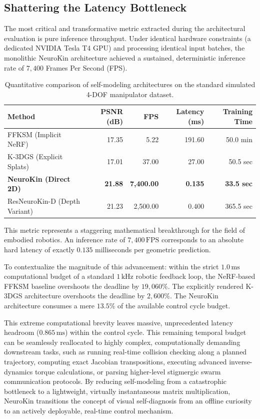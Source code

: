 \documentclass[12pt,a4paper,oneside]{report}
\begin{document}
\subsection{Shattering the Latency Bottleneck}

The most critical and transformative metric extracted during the architectural evaluation is pure inference throughput. Under identical hardware constraints (a dedicated NVIDIA Tesla T4 GPU) and processing identical input batches, the monolithic NeuroKin architecture achieved a sustained, deterministic inference rate of $7{,}400$ Frames Per Second (FPS).

\begin{table}[H]
\centering
\caption{Quantitative comparison of self-modeling architectures on the standard simulated 4-DOF manipulator dataset.}
\label{tab:final_baseline_metrics}
\begin{tabular}{lrrrr}
\toprule
\textbf{Method} & \textbf{PSNR (dB)} & \textbf{FPS} & \textbf{Latency (ms)} & \textbf{Training Time} \\
\midrule
FFKSM (Implicit NeRF) & 17.35 & 5.22 & 191.60 & 50.0 min \\
K-3DGS (Explicit Splats) & 17.01 & 37.00 & 27.00 & 50.5 sec \\
\textbf{NeuroKin (Direct 2D)} & \textbf{21.88} & \textbf{7,400.00} & \textbf{0.135} & \textbf{33.5 sec} \\
ResNeuroKin-D (Depth Variant) & 21.23 & 2,500.00 & 0.400 & 365.5 sec \\
\bottomrule
\end{tabular}
\end{table}

This metric represents a staggering mathematical breakthrough for the field of embodied robotics. An inference rate of $7{,}400\,\mathrm{FPS}$ corresponds to an absolute hard latency of exactly $0.135$ milliseconds per geometric prediction. 

To contextualize the magnitude of this advancement: within the strict $1.0\,\mathrm{ms}$ computational budget of a standard $1\,\mathrm{kHz}$ robotic feedback loop, the NeRF-based FFKSM baseline overshoots the deadline by $19,060\%$. The explicitly rendered K-3DGS architecture overshoots the deadline by $2,600\%$. The NeuroKin architecture consumes a mere $13.5\%$ of the available control cycle budget. 

This extreme computational brevity leaves massive, unprecedented latency headroom ($0.865\,\mathrm{ms}$) within the control cycle. This remaining temporal budget can be seamlessly reallocated to highly complex, computationally demanding downstream tasks, such as running real-time collision checking along a planned trajectory, computing exact Jacobian transpositions, executing advanced inverse-dynamics torque calculations, or parsing higher-level stigmergic swarm communication protocols. By reducing self-modeling from a catastrophic bottleneck to a lightweight, virtually instantaneous matrix multiplication, NeuroKin transitions the concept of visual self-diagnosis from an offline curiosity to an actively deployable, real-time control mechanism.
\end{document}
